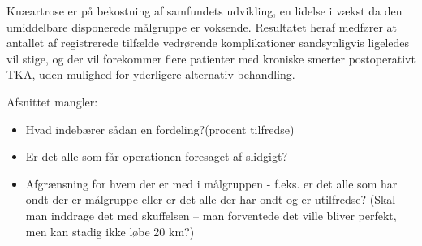 Knæartrose er på bekostning af samfundets udvikling, en lidelse i vækst da den umiddelbare disponerede målgruppe er voksende. Resultatet heraf medfører at antallet af registrerede tilfælde vedrørende komplikationer sandsynligvis ligeledes vil stige, og der vil forekommer flere patienter med kroniske smerter postoperativt TKA, uden mulighed for yderligere alternativ behandling. 


Afsnittet mangler:
\begin{itemize}
	\item Hvad indebærer sådan en fordeling?(procent tilfredse)
	\item Er det alle som får operationen foresaget af slidgigt?
	\item Afgrænsning for hvem der er med i målgruppen - f.eks. er det alle som har ondt der er målgruppe eller er det alle der har ondt og er utilfredse? (Skal man inddrage det med skuffelsen – man forventede det ville bliver perfekt, men kan stadig ikke løbe 20 km?) 

\end{itemize}


